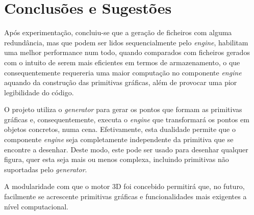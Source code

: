 \documentclass[a4paper]{article}
\begin{document}
\newpage
\section{Conclusões e Sugestões}

\hspace{8mm} Após experimentação, concluiu-se que a geração de ficheiros com alguma redundância, mas que podem ser lidos sequencialmente pelo \textit{engine}, habilitam uma melhor performance num todo, quando comparados com ficheiros gerados com o intuito de serem mais eficientes em termos de armazenamento, o que consequentemente requereria uma maior computação no componente \textit{engine} aquando da construção das primitivas gráficas, além de provocar uma pior legibilidade do código.

\hspace{3mm} O projeto utiliza o \textit{generator} para gerar os pontos que formam as primitivas gráficas e, consequentemente, executa o \textit{engine} que transformará os pontos em objetos concretos, numa cena. Efetivamente, esta dualidade permite que o componente \textit{engine} seja completamente independente da primitiva que se encontre a desenhar. Deste modo, este pode ser usado para desenhar qualquer figura, quer esta seja mais ou menos complexa, incluindo primitivas não suportadas pelo \textit{generator}.

\hspace{3mm} A modularidade com que o motor 3D foi concebido permitirá que, no futuro, facilmente se acrescente primitivas gráficas e funcionalidades mais exigentes a nível computacional.

\newpage


\end{document}
